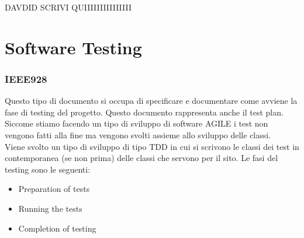 \documentclass{article}
\begin{document}
DAVDID SCRIVI QUIIIIIIIIIIIIIII

\newpage
\section{Software Testing}
\subsubsection{IEEE928}
Questo tipo di documento si occupa di specificare e documentare come avviene la fase di testing
del progetto. Questo documento rappresenta anche il test plan. Siccome stiamo facendo un tipo di
sviluppo di software AGILE i test non vengono fatti alla fine ma vengono svolti assieme allo
sviluppo delle classi.
\\Viene svolto un tipo di sviluppo di tipo TDD in cui si scrivono le classi dei test in 
contemporanea (se non prima) delle classi che servono per il sito. Le fasi del testing sono le 
seguenti:
\begin{itemize}
    \item Preparation of tests 
    \item Running the  tests
    \item Completion of testing
\end{itemize} 
\end{document}
